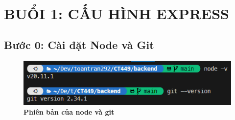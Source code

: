 \section*{BUỔI 1: CẤU HÌNH EXPRESS}
\setcounter{section}{1}
{}
\subsection*{Bước 0: Cài đặt Node và Git}
\setcounter{subsection}{1}
\setcounter{figure}{0}
\begin{figure}[H]
  \centering
  \includegraphics{images/chapterFirst/1.png}
  \caption{\bfseries Phiên bản của node và git}
\end{figure}
